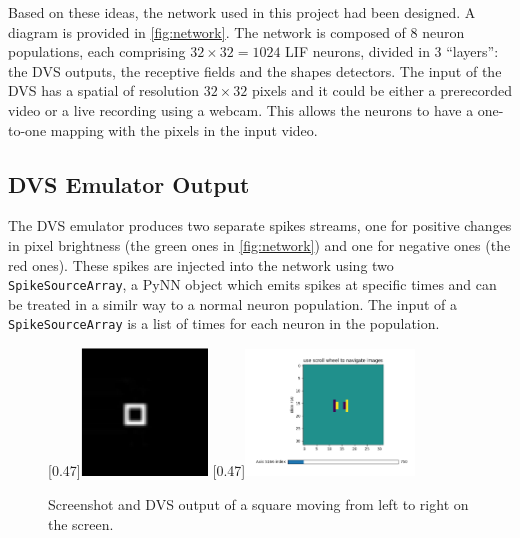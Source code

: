 Based on these ideas, the network used in this project had been designed. A diagram is provided in \cref{fig:network}. The network is composed of 8 neuron populations, each comprising  $32 \times 32 = 1024$ LIF neurons, divided in 3 ``layers'': the DVS outputs, the receptive fields and the shapes detectors. The input of the DVS has a spatial of resolution $32 \times 32$ pixels and it could be either a prerecorded video or a live recording using a webcam. This allows the neurons to have a one-to-one mapping with the pixels in the input video. 

\subsection{DVS Emulator Output}
The DVS emulator produces two separate spikes streams, one for positive changes in pixel brightness (the green ones in \cref{fig:network}) and one for negative ones (the red ones). These spikes are injected into the network using two \texttt{SpikeSourceArray}, a PyNN object which emits spikes at specific times and can be treated in a similr way to a normal neuron population. The input of a \texttt{SpikeSourceArray} is a list of times for each neuron in the population. 

\begin{figure}[ht]
\centering
{}
  [0.47\textwidth]{\includegraphics[width=0.30\textwidth]{images/development/dvs_square_lr.png}}
  [0.47\textwidth]{\includegraphics[width=0.4\textwidth]{images/development/spikes_square_lr.png}}
\caption[DVS Output of a Square]{Screenshot and DVS output of a square moving from left to right on the screen.}
\label{fig:square_lr}
\end{figure}

